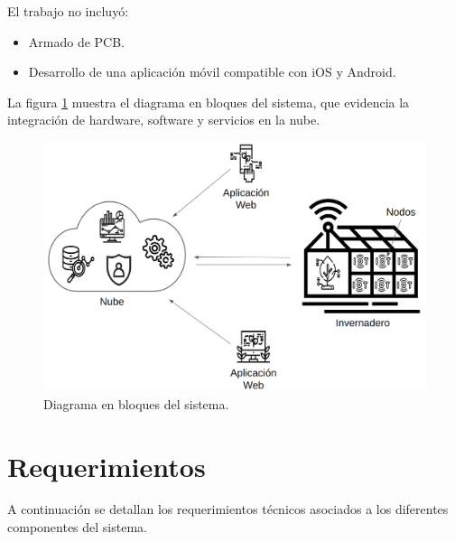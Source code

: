El trabajo no incluyó:
\begin{itemize}
      \item Armado de PCB.
      \item Desarrollo de una aplicación móvil compatible con iOS y Android.
\end{itemize}

\hspace{1cm}

La figura \ref{fig:diagBloques} muestra el diagrama en bloques del sistema, que
evidencia la integración de hardware, software y servicios en la nube.

\begin{figure}[htpb]
      \centering
      \includegraphics[width=.85\textwidth]{./Images/1.png}
      \caption{Diagrama en bloques del sistema.}
      \label{fig:diagBloques}
\end{figure}


\section{Requerimientos}

A continuación se detallan los requerimientos técnicos asociados a los
diferentes componentes del sistema.

